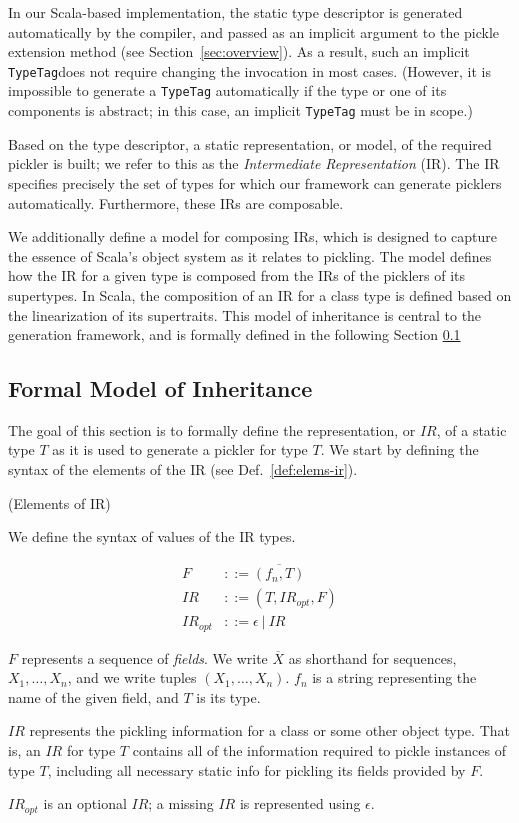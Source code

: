 \documentclass[preprint,10pt]{sigplanconf}
\theoremstyle{definition}
\theoremstyle{definition}
\newcommand{\term}[1]{\mbox{\texttt{#1}}}
\begin{document}
In our Scala-based implementation, the static type descriptor is generated
automatically by the compiler, and passed as an implicit argument to the
pickle extension method (see Section~\ref{sec:overview}). As a result, such an
implicit \term{TypeTag}\footnotemark[2] does not require changing the invocation in most cases.
(However, it is impossible to generate a \term{TypeTag} automatically if the
type or one of its components is abstract; in this case, an implicit
\term{TypeTag} must be in scope.)

Based on the type descriptor, a static representation, or model, of the
required pickler is built; we refer to this as the {\em Intermediate
Representation} (IR). The IR specifies precisely the set of types for which
our framework can generate picklers automatically. Furthermore, these IRs are composable.

We additionally define a model for composing IRs, which is designed to capture
the essence of Scala's object system as it relates to pickling. The model
defines how the IR for a given type is composed from the IRs of the picklers
of its supertypes. In Scala, the composition of an IR for a class type is
defined based on the linearization of its supertraits. \footnotemark[3]
This model of inheritance is central to the generation framework, and is
formally defined in the following Section \ref{sec:ir}

\subsection{Formal Model of Inheritance}
\label{sec:ir}

The goal of this section is to formally define the representation, or
$IR$, of a static type $T$ as it is used to generate a pickler for
type $T$. We start by defining the syntax of the elements of the IR
(see Def.~\ref{def:elems-ir}).

\begin{defn}{(Elements of IR)}
\label{def:elems-ir}

We define the syntax of values of the IR types.

\begin{align*}
F&        ::= \overline{(f_n, T)}\\
IR&       ::= (T, IR_{opt}, F)\\
IR_{opt}& ::= \epsilon~|~IR
\end{align*}

$F$ represents a sequence of \textit{fields}. We write $\overline{X}$ as
shorthand for sequences, $X_1,\dots,X_n$, and we write tuples
$(X_1,\dots,X_n)$. $f_n$ is a string representing the name of the given field,
and $T$ is its type.

$IR$ represents the pickling information for a class or some other object
type. That is, an $IR$ for type $T$ contains all of the information required
to pickle instances of type $T$, including all necessary static info for
pickling its fields provided by $F$.

$IR_{opt}$ is an optional $IR$; a missing $IR$ is represented using $\epsilon$.
\end{defn}
\end{document}
